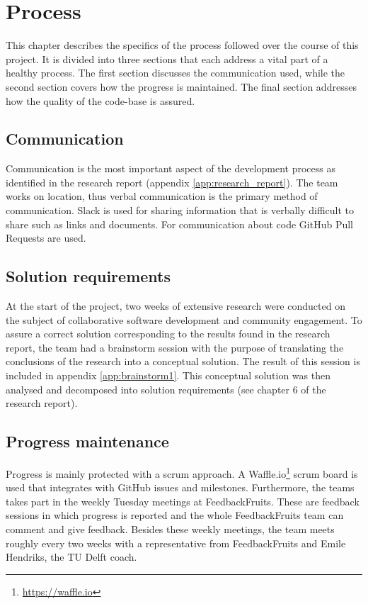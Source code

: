\chapter{Process}

This chapter describes the specifics of the process followed over the course of this project. It is divided into three sections that each address a vital part of a healthy process. The first section discusses the communication used, while the second section covers how the progress is maintained. The final section addresses how the quality of the code-base is assured.

\section{Communication}
Communication is the most important aspect of the development process as identified in the research report (appendix \ref{app:research_report}). The team works on location, thus verbal communication is the primary method of communication. Slack is used for sharing information that is verbally difficult to share such as links and documents. For communication about code GitHub Pull Requests are used.

\section{Solution requirements}
At the start of the project, two weeks of extensive research were conducted on the subject of collaborative software development and community engagement. To assure a correct solution corresponding to the results found in the research report, the team had a brainstorm session with the purpose of translating the conclusions of the research into a conceptual solution. The result of this session is included in appendix  \ref{app:brainstorm1}. This conceptual solution was then analysed and decomposed into solution requirements (see chapter 6 of the research report).

\section{Progress maintenance}
Progress is mainly protected with a scrum approach. A Waffle.io\footnote{\url{https://waffle.io}} scrum board is used that integrates with GitHub issues and milestones. Furthermore, the teams takes part in the weekly Tuesday meetings at FeedbackFruits. These are feedback sessions in which progress is reported and the whole FeedbackFruits team can comment and give feedback. Besides these weekly meetings, the team meets roughly every two weeks with a representative from FeedbackFruits and Emile Hendriks, the TU Delft coach.

